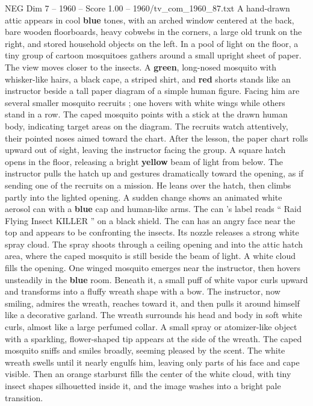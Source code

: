 \begin{textsample}{NEG Dim 7 – 1960 – Score 1.00 – 1960/tv\_com\_1960\_87.txt}  \label{ex:f7_neg_076}
A hand-drawn attic appears in cool \textbf{blue} tones, with an arched window centered at the back, bare wooden floorboards, heavy cobwebs in the corners, a large old trunk on the right, and stored household objects on the left.
In a pool of light on the floor, a tiny group of cartoon mosquitoes gathers around a small upright sheet of paper.
The view moves closer to the insects.
A \textbf{green}, long-nosed mosquito with whisker-like hairs, a black cape, a striped shirt, and \textbf{red} shorts stands like an instructor beside a tall paper diagram of a simple human figure.
Facing him are several smaller mosquito recruits ; one hovers with white wings while others stand in a row.
The caped mosquito points with a stick at the drawn human body, indicating target areas on the diagram.
The recruits watch attentively, their pointed noses aimed toward the chart.
After the lesson, the paper chart rolls upward out of sight, leaving the instructor facing the group.
A square hatch opens in the floor, releasing a bright \textbf{yellow} beam of light from below.
The instructor pulls the hatch up and gestures dramatically toward the opening, as if sending one of the recruits on a mission.
He leans over the hatch, then climbs partly into the lighted opening.
A sudden change shows an animated white aerosol can with a \textbf{blue} cap and human-like arms.
The can ’s label reads “ Raid Flying Insect KILLER ” on a black shield.
The can has an angry face near the top and appears to be confronting the insects.
Its nozzle releases a strong white spray cloud.
The spray shoots through a ceiling opening and into the attic hatch area, where the caped mosquito is still beside the beam of light.
A white cloud fills the opening.
One winged mosquito emerges near the instructor, then hovers unsteadily in the \textbf{blue} room.
Beneath it, a small puff of white vapor curls upward and transforms into a fluffy wreath shape with a bow.
The instructor, now smiling, admires the wreath, reaches toward it, and then pulls it around himself like a decorative garland.
The wreath surrounds his head and body in soft white curls, almost like a large perfumed collar.
A small spray or atomizer-like object with a sparkling, flower-shaped tip appears at the side of the wreath.
The caped mosquito sniffs and smiles broadly, seeming pleased by the scent.
The white wreath swells until it nearly engulfs him, leaving only parts of his face and cape visible.
Then an orange starburst fills the center of the white cloud, with tiny insect shapes silhouetted inside it, and the image washes into a bright pale transition.

\end{textsample}
